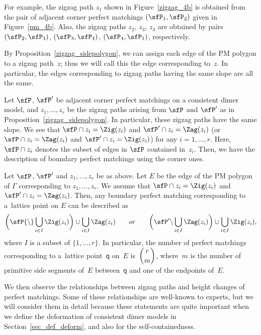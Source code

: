 For example, the zigzag path $z_1$ shown in Figure~\ref{zigzag_4b} is obtained from the pair of adjacent corner perfect matchings $(\sfP_1,\sfP_2)$ given in Figure~\ref{pm_4b}. Also, the zigzag paths $z_2$, $z_3$, $z_4$ are obtained by pairs $(\sfP_2,\sfP_3)$, $(\sfP_3,\sfP_4)$, $(\sfP_4,\sfP_1)$, respectively.

By Proposition~\ref{zigzag_sidepolygon}, we can assign each edge of the PM polygon to a zigzag path~$z$;
thus we will call this the edge corresponding to~$z$.
In particular, the edges corresponding to zigzag paths having the same slope are all the same.

Let $\sfP$, $\sfP^\prime$ be adjacent corner perfect matchings on a consistent dimer model, and $z_1,\dots, z_r$ be the zigzag paths arising from $\sfP$ and $\sfP^\prime$ as in Proposition~\ref{zigzag_sidepolygon}.
In particular, these zigzag paths have the same slope.
We see that $\sfP\cap z_i=\Zig(z_i)$ and $\sfP^\prime\cap z_i=\Zag(z_i)$ (or $\sfP\cap z_i=\Zag(z_i)$ and $\sfP^\prime\cap z_i=\Zig(z_i)$) for any $i=1,\dots,r$. Here, $\sfP\cap z_i$ denotes the subset of edges in $\sfP$ contained in~$z_i$.
Then, we have the description of boundary perfect matchings using the corner ones.

\begin{Proposition}\label{char_bound}
Let $\sfP$, $\sfP^\prime$ and $z_1,\dots, z_r$ be as above.
Let $E$ be the edge of the PM polygon of $\Gamma$ corresponding to $z_1,\dots, z_r$.
We assume that $\sfP\cap z_i=\Zig(z_i)$ and $\sfP^\prime\cap z_i=\Zag(z_i)$.
Then, any boundary perfect matching corresponding to a~lattice point on $E$ can be described as
\begin{displaymath}
\bigg(\sfP{\setminus}\bigcup_{i\in I}\Zig(z_i)\bigg)\cup\bigcup_{i\in I}\Zag(z_i) \qquad or \qquad \bigg(\sfP^\prime{\setminus}\bigcup_{i\in I}\Zag(z_i)\bigg)\cup\bigcup_{i\in I}\Zig(z_i),
\end{displaymath}
where $I$ is a subset of $\{1, \dots, r\}$.
In particular, the number of perfect matchings corresponding to a~lattice point~$\mathsf{q}$ on~$E$ is~$\dbinom{r}{m}$,
where~$m$ is the number of primitive side segments of~$E$ between~$\mathsf{q}$ and one of the endpoints of~$E$.
\end{Proposition}

We then observe the relationships between zigzag paths and height changes of perfect matchings.
Some of these relationships are well-known to experts, but we will consider them in detail because these statements are quite important
when we define the deformation of consistent dimer models in Section~\ref{sec_def_deform}, and also for the self-containedness.


